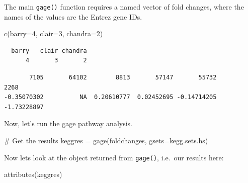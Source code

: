 \documentclass[
  letterpaper,
  DIV=11,
  numbers=noendperiod]{scrartcl}
\newenvironment{Shaded}{\begin{snugshade}}{\end{snugshade}}
\newcommand{\AttributeTok}[1]{\textcolor[rgb]{0.40,0.45,0.13}{#1}}
\newcommand{\CommentTok}[1]{\textcolor[rgb]{0.37,0.37,0.37}{#1}}
\newcommand{\DecValTok}[1]{\textcolor[rgb]{0.68,0.00,0.00}{#1}}
\newcommand{\FunctionTok}[1]{\textcolor[rgb]{0.28,0.35,0.67}{#1}}
\newcommand{\NormalTok}[1]{\textcolor[rgb]{0.00,0.23,0.31}{#1}}
\newcommand{\OtherTok}[1]{\textcolor[rgb]{0.00,0.23,0.31}{#1}}
\newcommand{\SpecialCharTok}[1]{\textcolor[rgb]{0.37,0.37,0.37}{#1}}
\begin{document}
The main \texttt{gage()} function requires a named vector of fold
changes, where the names of the values are the Entrez gene IDs.

\begin{Shaded}
\begin{Highlighting}[]
\FunctionTok{c}\NormalTok{(}\AttributeTok{barry=}\DecValTok{4}\NormalTok{, }\AttributeTok{clair=}\DecValTok{3}\NormalTok{, }\AttributeTok{chandra=}\DecValTok{2}\NormalTok{)}
\end{Highlighting}
\end{Shaded}

\begin{verbatim}
  barry   clair chandra 
      4       3       2 
\end{verbatim}

\begin{Shaded}
\end{Shaded}

\begin{verbatim}
       7105       64102        8813       57147       55732        2268 
-0.35070302          NA  0.20610777  0.02452695 -0.14714205 -1.73228897 
\end{verbatim}

Now, let's run the gage pathway analysis.

\begin{Shaded}
\begin{Highlighting}[]
\CommentTok{\# Get the results}
\NormalTok{keggres }\OtherTok{=} \FunctionTok{gage}\NormalTok{(foldchanges, }\AttributeTok{gsets=}\NormalTok{kegg.sets.hs)}
\end{Highlighting}
\end{Shaded}

Now lets look at the object returned from \texttt{gage()}, i.e.~our
results here:

\begin{Shaded}
\begin{Highlighting}[]
\FunctionTok{attributes}\NormalTok{(keggres)}
\end{Highlighting}
\end{Shaded}
\end{document}
